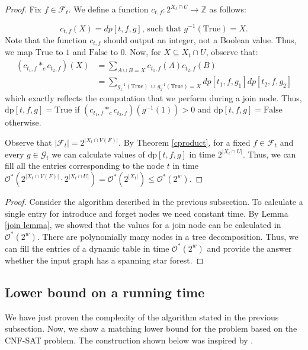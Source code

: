 \documentclass[en]{pracamgr}
\theoremstyle{definition}
\newcommand{\ssf}{spanning star forest}
\newcommand{\cnfsat}{{\sc CNF-SAT}}
\newcommand{\dpt}[1]{\textrm{dp}[#1]}
\newcommand{\true}{\textrm{True}}
\newcommand{\false}{\textrm{False}}
\begin{document}
\begin{proof}
	Fix $f \in \mathcal{F}_t$. We define a function $c_{t,f}:2^{X_t \cap U} \rightarrow \mathbb{Z}$ as follows:
	
	\begin{equation*}
		c_{t,f}(X) = dp[t,f,g] \text{, such that $g^{-1}(\true) = X$}.
	\end{equation*}	
	Note that the function $c_{t,f}$ should output an integer, not a Boolean value. Thus, we map $\true$ to $1$ and $\false$ to $0$. Now, for $X \subseteq X_t \cap U$, observe that: 
	\begin{align*}
		(c_{t_1,f} *_c c_{t_2,f})(X) &= \sum\limits_{A \cup B = X} c_{t_1,f}(A)c_{t_2,f}(B) \\
		&= \sum\limits_{ g_1^{-1}(\true)\ \cup\ g_2^{-1}(\true) = X} dp[t_1,f,g_1]dp[t_2,f,g_2]	
	\end{align*}
	which exactly reflects the computation that we perform during a join node. Thus, $\dpt{t,f,g} = \true$ if $(c_{t_1,f} *_c c_{t_2,f})(g^{-1}(1)) > 0$ and $\dpt{t,f,g} = \false$ otherwise. 
	
	Observe that $|\mathcal{F}_t| = 2^{|X_t \cap V(F)|}$. By Theorem \ref{cproduct}, for a fixed $f \in \mathcal{F}_t$ and every $g \in \mathcal{G}_t$ we can calculate values of $\dpt{t,f,g}$ in time $2^{|X_t \cap U|}$. Thus, we can fill all the entries corresponding to the node $t$ in time $\mathcal{O}^*(2^{|X_t \cap V(F)|} \cdot 2^{|X_t \cap U|}) = \mathcal{O}^*(2^{|X_t|}) \leq \mathcal{O}^*(2^w)$.
\end{proof}

\thmssfeptwtime*

\begin{proof}
	Consider the algorithm described in the previous subsection. To calculate a single entry for introduce and forget nodes we need constant time. By Lemma \ref{join lemma}, we showed that the values for a join node can be calculated in $\mathcal{O}^*(2^w)$. There are polynomially many nodes in a tree decomposition. Thus, we can fill the entries of a dynamic table in time $\mathcal{O}^*(2^{w})$ and provide the answer whether the input graph has a \ssf{}.
\end{proof}

\subsection{Lower bound on a running time}

We have just proven the complexity of the algorithm stated in the previous subsection. Now, we show a matching lower bound for the problem based on the \cnfsat{} problem. The construction shown below was inspired by \cite{TREEWIDTH}.
\end{document}
